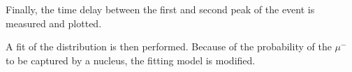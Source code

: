 Finally, the time delay between the first and second peak of the event is measured and plotted.

A fit of the distribution is then performed. 
Because of the probability of the $\mu^-$ to be captured by a nucleus, the fitting model is modified.

